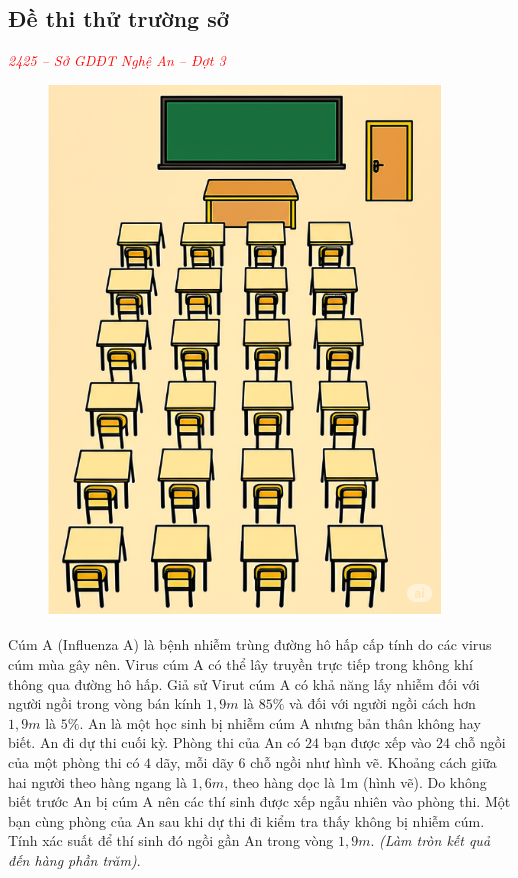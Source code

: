 \documentclass[twoside,final]{hcmut-report}
\newcommand{\exercise}[1]{\begin{exercisebox}#1\end{exercisebox}}
\begin{document}
\subsection{Đề thi thử trường sở}
\exercise{\textcolor{red}{\textit{2425 -- Sở GDĐT Nghệ An -- Đợt 3}}

    \begin{figure}
        \centering
        \includegraphics[width=1.08\linewidth]{images/Nghệ An 2025 - Đợt 3/NgheAn25-2.png}
    \end{figure}
    Cúm A (Influenza A) là bệnh nhiễm trùng đường hô hấp cấp tính do các virus cúm mùa gây nên. Virus cúm A có thể lây truyền trực tiếp trong không khí thông qua đường hô hấp. Giả sử Virut cúm A có khả năng lấy nhiễm đối với người ngồi trong vòng bán kính $1,9m$ là $85\%$ và đối với người ngồi cách hơn $1,9m$ là $5\%$. An là một học sinh bị nhiễm cúm A nhưng bản thân không hay biết. An đi dự thi cuối kỳ. Phòng thi của An có $24$ bạn được xếp vào $24$ chỗ ngồi của một phòng thi có $4$ dãy, mỗi dãy $6$ chỗ ngồi như hình vẽ. Khoảng cách giữa hai người theo hàng ngang là $1,6m$, theo hàng dọc là 1m (hình vẽ). Do không biết trước An bị cúm A nên các thí sinh được xếp ngẫu nhiên vào phòng thi. Một bạn cùng phòng của An sau khi dự thi đi kiểm tra thấy không bị nhiễm cúm. Tính xác suất để thí sinh đó ngồi gần An trong vòng $1,9m$. \textit{(Làm tròn kết quả đến hàng phần trăm)}.
}
\end{document}
